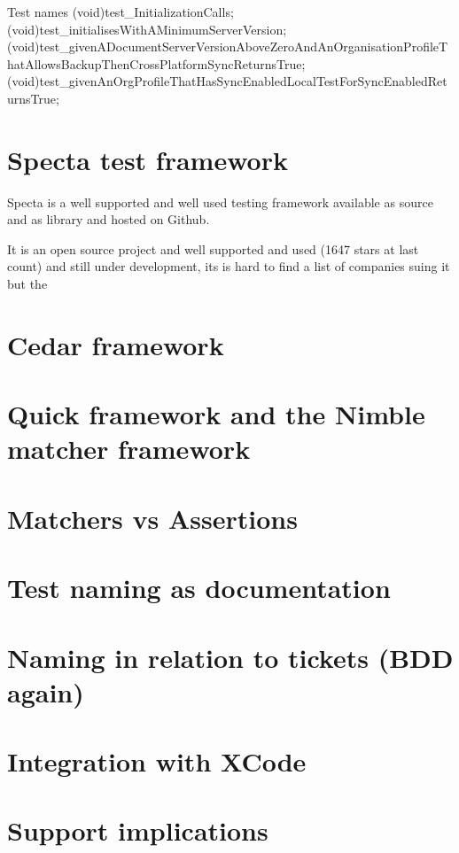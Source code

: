 \documentclass[a4paper, titlepage]{article}
\begin{document}
  \begin{listbox}{1}{Test names}
       (void)test_InitializationCalls;
       (void)test_initialisesWithAMinimumServerVersion;
       (void)test_givenADocumentServerVersionAboveZeroAndAnOrganisationProfileThatAllowsBackupThenCrossPlatformSyncReturnsTrue;
      (void)test_givenAnOrgProfileThatHasSyncEnabledLocalTestForSyncEnabledReturnsTrue;
  \end{listbox}
















  \section{Specta test framework}
  Specta is a well supported and well used testing framework available
  as source and as library and hosted on Github.

  It is an open source project and well supported and used (1647 stars
  at last count) and still under development, its is hard to find a list
  of companies suing it but the 
\section{Cedar framework}
\section{Quick framework and the Nimble matcher framework}
\section{Matchers vs Assertions}
\section{Test naming as documentation}
\section{Naming in relation to tickets (BDD again)}
\section{Integration with XCode}
\section{Support implications}
\end{document}
